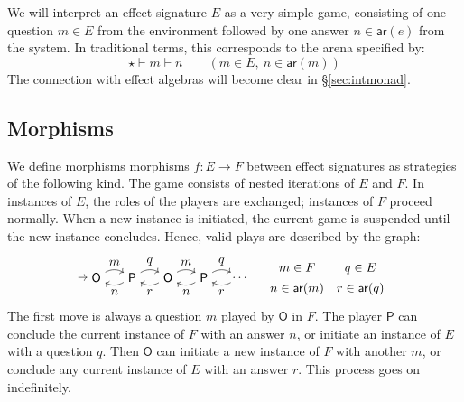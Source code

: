 \documentclass[format=sigplan,authordraft]{acmart}
\newcommand{\kw}[1]{\ensuremath{\mathsf{#1}}}
\begin{document}
We will interpret an effect signature $E$
as a very simple game,
consisting of
one question $m \in E$ from the environment followed by
one answer $n \in \kw{ar}(e)$ from the system.
In traditional terms,
this corresponds to the arena specified by:
\[
    \star \vdash m \vdash n \qquad
      (m \in E, \: n \in \kw{ar}(m))
\]
The connection with
effect algebras will become clear in \S\ref{sec:intmonad}.


\subsection{Morphisms} %
\label{sec:arrow}

We define morphisms morphisms $f : E \rightarrow F$
between effect signatures
as strategies of the following kind.
The game consists of nested iterations of $E$ and $F$.
In instances of $E$, the roles of the players are exchanged;
instances of $F$ proceed normally.
When a new instance is initiated,
the current game is suspended
until the new instance concludes.
Hence, valid plays
are described by the graph:
\[
  \begin{tikzpicture}[baseline=(O1.base)]
    \node (O1) at (0,0) {\kw{O}};
    \node (P1) at (1,0) {\kw{P}};
    \node (O2) at (2,0) {\kw{O}};
    \node (P2) at (3,0) {\kw{P}};
    \node (O3) at (4,0) {$\ldots$};
    \path [->] (-0.5,0) edge (O1);
    \path [->] (O1) edge[bend left] node[auto] {$m$} (P1);
    \path [->] (P1) edge[bend left] node[auto] {$n$} (O1);
    \path [->] (P1) edge[bend left] node[auto] {$q$} (O2);
    \path [->] (O2) edge[bend left] node[auto] {$r$} (P1);
    \path [->] (O2) edge[bend left] node[auto] {$m$} (P2);
    \path [->] (P2) edge[bend left] node[auto] {$n$} (O2);
    \path [->] (P2) edge[bend left] node[auto] {$q$} (O3);
    \path [->] (O3) edge[bend left] node[auto] {$r$} (P2);
  \end{tikzpicture}
  \quad
  \begin{array}{cc}
    m \in F & q \in E \\[1ex]
    n \in \kw{ar}(m) & r \in \kw{ar}(q)
  \end{array}
\]
The first move is always a question $m$ played by $\kw{O}$ in $F$.
The player $\kw{P}$ can conclude the current instance of $F$
with an answer $n$, or
initiate an instance of $E$
with a question $q$.
Then $\kw{O}$ can initiate a new instance of $F$
with another $m$, or
conclude any current instance of $E$
with an answer $r$.
This process goes on indefinitely.
\end{document}
